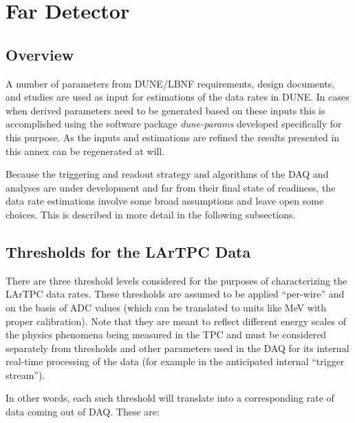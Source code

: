\chapter{Far Detector}
\label{ch:annex-rate}

\section{Overview}

A number of parameters from DUNE/LBNF requirements, design documents,  and studies are used  as input
for estimations of the data rates in DUNE. In cases when derived parameters need to be generated based on these inputs
this is accomplished using the software package \textit{dune-params}\cite{duneparams}
developed specifically for this purpose.
As the inputs and estimations are refined the results presented in
this annex can be regenerated at will.

Because the triggering and readout strategy and algorithms of the DAQ and
analyses are under development and far from their final state of readiness,
the data rate estimations involve some broad assumptions and leave open some choices.
This is described in more detail in the following subsections.



\section{Thresholds for the LArTPC Data}

There are three threshold levels considered for the purposes of characterizing the LArTPC data rates.
These thresholds are assumed to be applied ``per-wire'' and on the basis of ADC values (which can be translated
to units like MeV with proper calibration).
Note that they are meant to reflect different energy scales of the physics phenomena being
measured in the TPC and  must be considered separately from thresholds and other parameters used  in the
DAQ for its internal real-time processing of the data (for example in the anticipated internal ``trigger stream'').

In other words, each such threshold will translate into a corresponding rate of data coming out of DAQ. These are:

